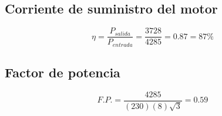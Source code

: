 \documentclass[]{article}
\begin{document}
\subsection{Corriente de suministro del motor}

\begin{equation}
\eta=\frac{P_{salida}}{P_{entrada}}=\frac{3728}{4285}=0.87=87\%
\end{equation}

\subsection{Factor de potencia}


\begin{equation}
  F.P.=\frac{4285}{(230)(8)\sqrt{3}}=0.59  
\end{equation}
\end{document}
